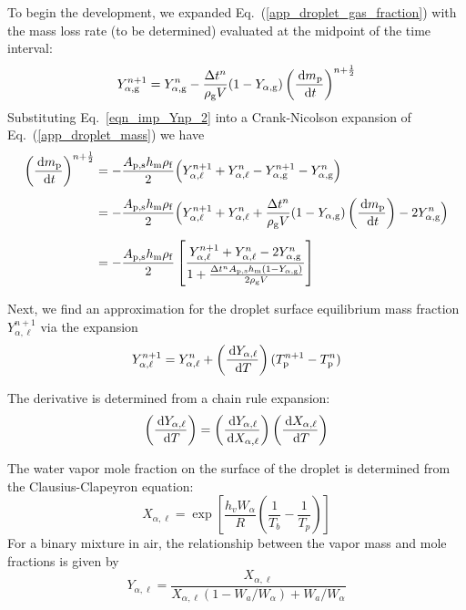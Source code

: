 To begin the development, we expanded Eq.~(\ref{app_droplet_gas_fraction}) with the mass loss rate (to be determined) evaluated at the midpoint of the time interval:
\begin{equation}
\label{eqn_imp_Ynp_2}
Y_{\rm \alpha, g}^{n+1}=Y_{\rm \alpha, g}^n-\frac{\Delta t^n}{\rho_{\rm g} V} (1-Y_{\rm \alpha, g}) \left(\frac{\,\mathrm{d} m_{\rm p}}{\,\mathrm{d} t}\right)^{n+\frac{1}{2}}
\end{equation}
Substituting Eq.~\ref{eqn_imp_Ynp_2} into a Crank-Nicolson expansion of Eq.~(\ref{app_droplet_mass}) we have
\begin{align}
\label{eqn_imp_dmdt_2}
\left(\frac{\,\mathrm{d} m_{\rm p}}{\,\mathrm{d} t} \right)^{n+\frac{1}{2}} &= -\frac{A_{\rm p,s} h_{\rm m}\rho_{\rm f}}{2} \Big(Y_{\alpha,\ell}^{n+1}+Y_{\alpha,\ell}^n-Y_{\rm \alpha, g}^{n+1}-Y_{\rm \alpha, g}^n \Big) \notag \\[.5em]
&= -\frac{A_{\rm p,s} h_{\rm m} \rho_{\rm f}}{2} \Big(Y_{\alpha,\ell}^{n+1}+Y_{\alpha,\ell}^n+\frac{\Delta t^n}{\rho_{\rm g} V} (1-Y_{\rm \alpha, g}) \left(\frac{\,\mathrm{d} m_{\rm p}}{\,\mathrm{d} t}\right)-2Y_{\rm \alpha, g}^n \Big) \notag \\[.5em]
&=-\frac{A_{\rm p,s} h_{\rm m} \rho_{\rm f}}{2} \left[\frac{Y^{n+1}_{\alpha,\ell}+Y^n_{\alpha,\ell}-2Y^n_{\rm \alpha, g}}{1+\frac{\Delta t^n A_{\rm p,s} h_{\rm m}(1-Y_{\rm \alpha, g})}{2 \rho_{\rm g} V}}\right]
\end{align}

Next, we find an approximation for the droplet surface equilibrium mass fraction $Y_{\alpha,\ell}^{n+1}$ via the expansion
\begin{equation}
\label{eqn_Yl_expansion}
Y_{\alpha,\ell}^{n+1} = Y_{\alpha,\ell}^n + \left(\frac{\,\mathrm{d} Y_{\alpha,\ell}}{\,\mathrm{d} T}\right) (T_{\rm p}^{n+1} - T_{\rm p}^n)
\end{equation}

The derivative is determined from a chain rule expansion:
\begin{equation}
\label{eqn_dYldY_chainrule}
\left(\frac{\,\mathrm{d} Y_{\alpha,\ell}}{\,\mathrm{d} T}\right) = \left(\frac{\,\mathrm{d} Y_{\alpha,\ell}}{\,\mathrm{d} X_{\alpha,\ell}}\right) \left(\frac{\,\mathrm{d} X_{\alpha,\ell}}{\,\mathrm{d} T}\right)
\end{equation}

The water vapor mole fraction on the surface of the droplet is determined from the Clausius-Clapeyron equation:
\begin{equation}
\label{app_Clausius_Clapeyron}
X_{\alpha,\ell} = \exp \left[ \frac{h_v W_{\alpha}}{R} \left(\frac{1}{T_b} - \frac{1}{T_p}\right) \right]
\end{equation}
For a binary mixture in air, the relationship between the vapor mass and mole fractions is given by
\begin{equation}
\label{eqn_YX}
Y_{\alpha,\ell} = \frac{X_{\alpha,\ell}}{X_{\alpha,\ell}(1-W_a/W_{\alpha}) + W_a/W_{\alpha}}
\end{equation}

